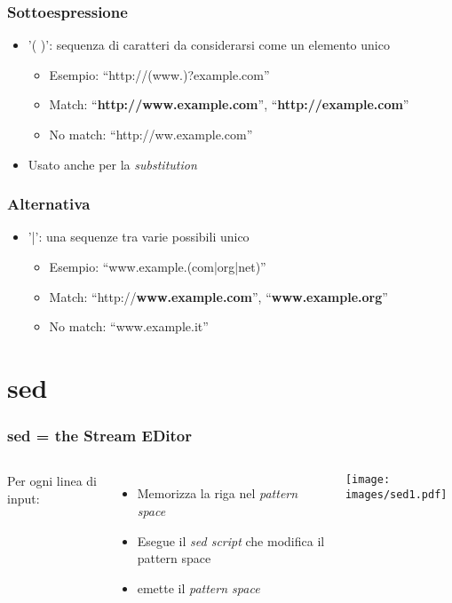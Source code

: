 \documentclass[xetex,table]{beamer}
\begin{document}
\begin{frame}
  \frametitle{Sottoespressione}
  \begin{itemize}
  \item '( )': sequenza di caratteri da considerarsi come un elemento
    unico
    \begin{itemize}
    \item Esempio: ``http://(www.)?example.com''
    \item Match: ``{\bf http://www.example.com}'', ``{\bf http://example.com}''
    \item No match: ``http://ww.example.com''
    \end{itemize}
    \item Usato anche per la {\em substitution}
  \end{itemize}
\end{frame}

\begin{frame}
  \frametitle{Alternativa}
  \begin{itemize}
  \item '|': una sequenze tra varie possibili
    unico
    \begin{itemize}
    \item Esempio: ``www.example.(com|org|net)''
    \item Match: ``http://{\bf www.example.com}'', ``{\bf www.example.org}''
    \item No match: ``www.example.it''
    \end{itemize}
  \end{itemize}
\end{frame}

\section{sed}

\begin{frame}
  \frametitle{sed = the Stream EDitor}
  \begin{columns}
    Per ogni linea di input:
    \begin{itemize}
    \item Memorizza la riga nel {\em pattern space}
    \item Esegue il {\em sed script} che modifica il pattern space
    \item emette il {\em pattern space}
    \end{itemize}
    \begin{center}
      \texttt{[image: images/sed1.pdf]}
    \end{center}
  \end{columns}
\end{frame}
\end{document}
